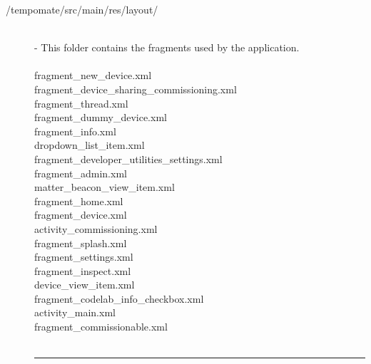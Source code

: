 \begin{enumerate}[label=\alph*]
\begin{description}
              \item[/tempomate/src/main/res/layout/] \hfill \\
                    \small
                    - This folder contains the fragments used by the application.\\\\
                    \footnotesize
                    fragment\_new\_device.xml  \\
                    fragment\_device\_sharing\_commissioning.xml  \\
                    fragment\_thread.xml  \\
                    fragment\_dummy\_device.xml  \\
                    fragment\_info.xml  \\
                    dropdown\_list\_item.xml  \\
                    fragment\_developer\_utilities\_settings.xml  \\
                    fragment\_admin.xml  \\
                    matter\_beacon\_view\_item.xml  \\
                    fragment\_home.xml  \\
                    fragment\_device.xml  \\
                    activity\_commissioning.xml  \\
                    fragment\_splash.xml  \\
                    fragment\_settings.xml  \\
                    fragment\_inspect.xml  \\
                    device\_view\_item.xml  \\
                    fragment\_codelab\_info\_checkbox.xml  \\
                    activity\_main.xml  \\
                    fragment\_commissionable.xml  \\\\

                    \vspace{-0.2cm}
                    \hrule
                    \vspace{0.2cm}


\end{description}
\end{enumerate}
